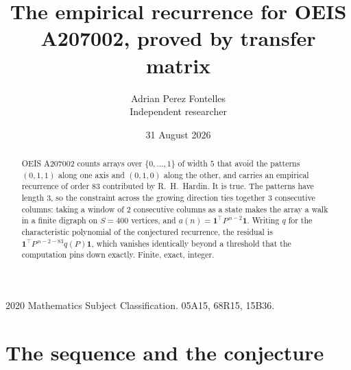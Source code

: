 \documentclass[11pt,a4paper]{article}
\title{The empirical recurrence for OEIS A207002, proved by transfer matrix}
\author{Adrian Perez Fontelles\\ \small Independent researcher}
\date{31 August 2026}
\theoremstyle{plain}
\theoremstyle{definition}
\begin{document}
\maketitle

\begin{abstract}
OEIS A207002 counts arrays over $\{0,\dots,1\}$ of width $5$ that avoid the patterns
$(0,1,1)$ along one axis and $(0,1,0)$ along the other, and carries an empirical recurrence of
order $83$ contributed by R.~H.~Hardin. It is true. The patterns have length $3$, so
the constraint across the growing direction ties together $3$ consecutive columns: taking a
window of $2$ consecutive columns as a state makes the array a walk in a finite digraph
on $S=400$ vertices, and $a(n)=\mathbf{1}^{\!\top}P^{\,n-2}\mathbf{1}$. Writing $q$
for the characteristic polynomial of the conjectured recurrence, the residual is
$\mathbf{1}^{\!\top}P^{\,n-2-83}q(P)\mathbf{1}$, which vanishes identically
beyond a threshold that the computation pins down exactly. Finite, exact, integer.
\end{abstract}

\noindent\small 2020 Mathematics Subject Classification. 05A15, 68R15, 15B36.\normalsize

\section{The sequence and the conjecture}
\end{document}
